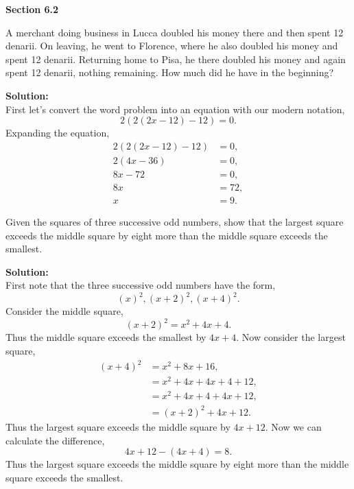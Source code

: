 \documentclass[12pt]{article}
\makeatletter
\theoremstyle{homework}
\newenvironment{exercise}[1]
{\def\@currentlabel{#1}\exercisecore}
{\endexercisecore}
\newcommand{\localhead}[1]{\par\smallskip\noindent\textbf{#1}\nobreak\\}%
\newcommand\solution{\localhead{Solution:}}
\makeatother
\begin{document}
\textbf{Section 6.2}

\begin{exercise}{2} A merchant doing business in Lucca doubled his money there and then spent 12 denarii. 
  On leaving, he went to Florence, where he also doubled his money and spent 12 denarii. 
  Returning home to Pisa, he there doubled his money and again spent 12 denarii, nothing remaining. 
  How much did he have in the beginning?\\
  \solution First let's convert the word problem into an equation with our modern notation,
  \begin{equation*}
    2(2(2x - 12)-12) = 0.
  \end{equation*}
  Expanding the equation,
  \begin{align*}
    2(2(2x - 12)-12) &= 0,\\
    2(4x - 36) &= 0,\\
    8x - 72 &= 0,\\
    8x &= 72,\\
    x &= 9.
  \end{align*}

\end{exercise}
\vspace{.5in}

\begin{exercise}{4} Given the squares of three successive odd numbers, show that the largest square exceeds
   the middle square by eight more than the middle square exceeds the smallest.\\
   \solution 
   First note that the three successive odd numbers have the form, 
   \begin{equation*}
     (x)^2, (x+2)^2, (x+4)^2.
   \end{equation*}
   Consider the middle square, 
   \begin{equation*}
     (x+2)^2 = x^2 + 4x + 4.
   \end{equation*}
   Thus the middle square exceeds the smallest by $4x + 4$. Now consider the largest square,
   \begin{align*}
    (x+4)^2 &= x^2 + 8x + 16,\\ 
            &= x^2 + 4x + 4x + 4 + 12,\\
            &= x^2 + 4x + 4 + 4x + 12,\\ 
            &= (x+2)^2 + 4x + 12.
   \end{align*}
   Thus the largest square exceeds the middle square by $4x + 12$. Now we can calculate the difference,
   \begin{equation*}
    4x + 12 - (4x + 4) = 8.
   \end{equation*}
   Thus the largest square exceeds the middle square by eight more than the middle square exceeds the smallest. 
   
\end{exercise}
\vspace{.5in}
\end{document}
